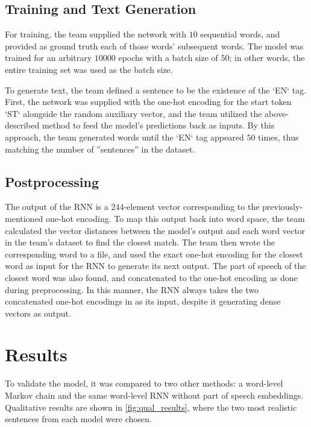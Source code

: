 \documentclass[conference]{IEEEtran}
\begin{document}
\subsection{Training and Text Generation}

For training, the team supplied the network with $10$ sequential words, and provided as ground truth each of those words’ subsequent words. The model was trained for an arbitrary $10000$ epochs with a batch size of $50$; in other words, the entire training set was used as the batch size. 

To generate text, the team defined a sentence to be the existence of the ‘EN‘ tag. First, the network was supplied with the one-hot encoding for the start token ‘ST‘ alongside the random auxiliary vector, and the team utilized the above-described method to feed the model’s predictions back as inputs. By this approach, the team generated words until the ‘EN‘ tag appeared $50$ times, thus matching the number of ”sentences” in the dataset. 


\subsection{Postprocessing}

The output of the RNN is a $244$-element vector corresponding to the previously-mentioned one-hot encoding. To map this output back into word space, the team calculated the vector distances between the model’s output and each word vector in the team’s dataset to find the closest match. The team then wrote the corresponding word to a file, and used the exact one-hot encoding for the closest word as input for the RNN to generate its next output. The part of speech of the closest word was also found, and concatenated to the one-hot encoding as done during preprocessing. In this manner, the RNN always takes the two concatenated one-hot encodings in as its input, despite it generating dense vectors as output. 

\section{Results}
To validate the model, it was compared to two other methods: a word-level Markov chain and the same word-level RNN without part of speech embeddings. Qualitative results are shown in \ref{fig:qual_results}, where the two most realistic sentences from each model were chosen.
\end{document}
